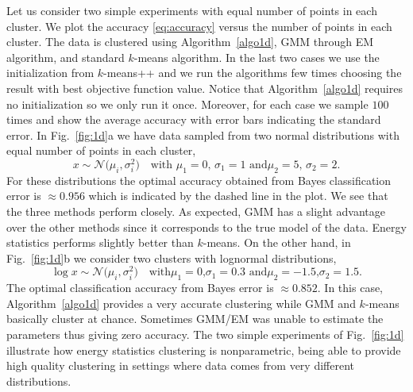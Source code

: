 \documentclass[aps,preprint,nofootinbib,floatfix]{revtex4-1}
\begin{document}
Let us consider two simple experiments with equal number of points
in each cluster. We plot the accuracy \eqref{eq:accuracy} versus the number
of points in each cluster.
The data is clustered using 
Algorithm~\ref{algo1d}, 
GMM through EM algorithm, and standard $k$-means 
algorithm. 
In the last two cases 
we use the initialization from $k$-means++ \cite{Vassilvitskii} 
and we run the algorithms
few times choosing the result with  best objective function value. 
Notice that Algorithm~\ref{algo1d} requires no initialization so we only
run it once.
Moreover, for each case we sample $100$ times
and show the average accuracy with error bars indicating
the standard error.
In  Fig.~\ref{fig:1d}a 
we have data sampled from two normal distributions with equal number of
points in each cluster,
\begin{equation}
\label{eq:two_normal}
x \sim \mathcal{N}\big(\mu_i,\sigma_i^2\big) 
\quad 
\mbox{with $\mu_1 = 0$, $\sigma_1=1$ and
$\mu_2 = 5$, $\sigma_2 = 2$.}
\end{equation}
For these distributions the optimal accuracy 
obtained from Bayes classification error
is $ \approx 0.956$ which is indicated by the dashed line in the plot.
We see that the three methods
perform closely. As expected, GMM has a slight advantage over the other
methods since
it corresponds to the true model of the data. 
Energy statistics performs slightly better
than $k$-means. On the other hand, in Fig.~\ref{fig:1d}b
we consider two clusters with lognormal distributions,
\begin{equation}
\label{eq:two_lognormal}
\log x \sim \mathcal{N}\big( \mu_i,\sigma_i^2\big) \quad
\mbox{with
$\mu_1 = 0$,
$\sigma_1 = 0.3$ and
$\mu_2 = -1.5$,
$\sigma_2 = 1.5$.}
\end{equation}
The optimal classification accuracy from Bayes error is $\approx 0.852$.
In this case,
Algorithm~\ref{algo1d} provides a very accurate clustering while
GMM and $k$-means basically cluster at chance.
Sometimes GMM/EM  was unable to estimate the parameters 
thus giving zero accuracy.
The two simple experiments of Fig.~\ref{fig:1d} illustrate
how energy statistics clustering is nonparametric, being able
to provide high quality clustering in settings where data comes
from very different distributions.
\end{document}
